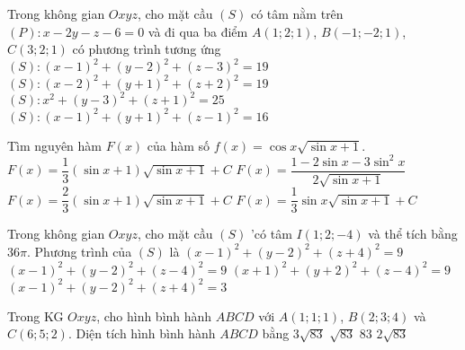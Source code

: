 \begin{ex}%
Trong không gian $ Oxyz $, cho mặt cầu $ (S) $ có tâm nằm trên $ (P):x-2y-z-6=0$ và đi qua ba điểm $ A(1 ; 2 ; 1) $, $ B(-1 ; -2 ; 1) $, $ C(3 ; 2 ; 1) $ có phương trình tương ứng
\choice
{$ (S): (x-1)^2+(y-2)^2+(z-3)^2=19$}
{\True $ (S): (x-2)^2+(y+1)^2+(z+2)^2=19$}
{$ (S): x^2+(y-3)^2+(z+1)^2=25$}
{$ (S): (x-1)^2+(y+1)^2+(z-1)^2=16$}
\end{ex}

\begin{ex}%
Tìm nguyên hàm $F(x)$ của hàm số $f(x)=\cos x\sqrt{\sin x+1}$.
\choice
{$F(x)=\dfrac{1}{3}(\sin x+1)\sqrt{\sin x+1}+C$}
{$F(x)=\dfrac{1-2\sin x-3\sin^2 x}{2\sqrt{\sin x+1}}$}
{\True $F(x)=\dfrac{2}{3}(\sin x+1)\sqrt{\sin x+1}+C$}
{$F(x)=\dfrac{1}{3}\sin x\sqrt{\sin x+1}+C$}
\end{ex}

\begin{ex}%
Trong không gian $O x y z$, cho mặt cầu $(S)$ 'có tâm $I(1 ; 2 ;-4)$ và thể tích bằng $36 \pi$. Phương trình của $(S)$ là
\choice
{\True $(x-1)^{2}+(y-2)^{2}+(z+4)^{2}=9$}
{$(x-1)^{2}+(y-2)^{2}+(z-4)^{2}=9$}
{$(x+1)^{2}+(y+2)^{2}+(z-4)^{2}=9$}
{$(x-1)^{2}+(y-2)^{2}+(z+4)^{2}=3$}
\end{ex}

\begin{ex}%
Trong KG $Oxyz$, cho hình bình hành  $ABCD$ với  $A(1;1;1)$, $B(2;3;4)$ và $C(6;5;2)$. Diện tích hình bình hành $ABCD$  bằng \choice
{$3\sqrt{83} $}
{$\sqrt{83} $}
{$ 83 $}
{\True $2\sqrt{83}$}
\end{ex}

